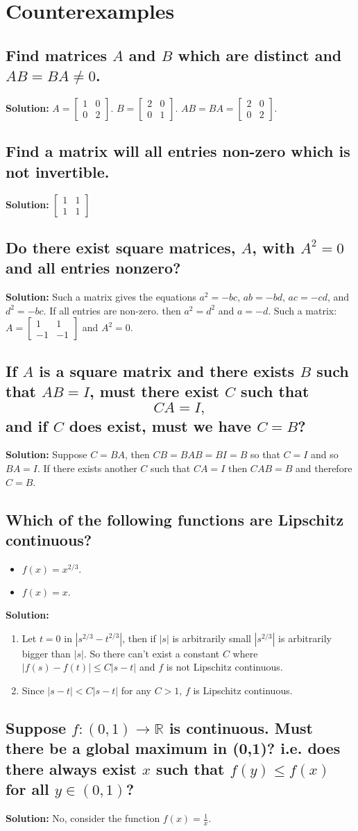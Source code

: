 \documentclass{article}
\newcommand{\exercise}[1]{\subsection{\normalfont #1}}
\newcommand{\solution}{\indent\indent \textbf{Solution: }}
\begin{document}
\section{Counterexamples} %
\exercise{Find matrices $A$ and $B$ which are distinct and $AB = BA \neq 0$.}
\solution $A = \begin{bmatrix} 1 & 0 \\ 0 & 2\end{bmatrix}.$ $B = \begin{bmatrix} 2 & 0 \\ 0 & 1 \end{bmatrix}.$ $AB = BA = \begin{bmatrix} 2 & 0 \\ 0 & 2\end{bmatrix}. $
\exercise{Find a matrix will all entries non-zero which is not invertible.}
\solution $\begin{bmatrix} 1 & 1 \\ 1 & 1 \end{bmatrix}$
\exercise{Do there exist square matrices, $A$, with $A^2 = 0$ and all entries nonzero?}
\solution Such a matrix gives the equations $a^2 = -bc$, $ab = -bd$, $ac = -cd$, and $d^2 = -bc$. If all entries are non-zero. then $a^2 = d^2$ and $a = -d$. Such a matrix: $A = \begin{bmatrix} 1 & 1 \\ -1 & -1\end{bmatrix}$ and $A^2 = 0$.
\exercise{If $A$ is a square matrix and there exists $B$ such that $AB = I$, must there exist $C$ such that $$CA = I,$$ and if $C$ does exist, must we have $C = B$?}
\solution Suppose $C=BA $, then $CB=BAB = BI = B$ so that $C = I$ and so $BA=I$. If there exists another $C$ such that $CA = I$ then $CAB = B$ and therefore $C=B$.
\exercise{Which of the following functions are Lipschitz continuous?}
\begin{itemize}
\item $f(x) = x^{2/3}$.
\item $f(x) = x.$
\end{itemize}
\solution 
\begin{enumerate}
\item Let $t=0$ in $|s^{2/3} -t^{2/3}|$, then if $|s|$ is arbitrarily small $|s^{2/3}|$ is arbitrarily bigger than $|s|$. So there can't exist a constant $C$ where $|f(s)-f(t)| \leq C|s-t|$ and $f$ is not Lipschitz continuous.
\item Since $|s-t| < C|s-t|$ for any $C>1$, $f$ is Lipschitz continuous. 
\end{enumerate}
\exercise{Suppose $f:(0,1)\to \mathbb{R}$ is continuous. Must there be a global maximum in (0,1)? i.e. does there always exist $x$ such that $f(y) \leq f(x)$ for all $y\in (0,1)$?}
\solution No, consider the function $f(x) = \frac{1}{x}$. 
\end{document}
